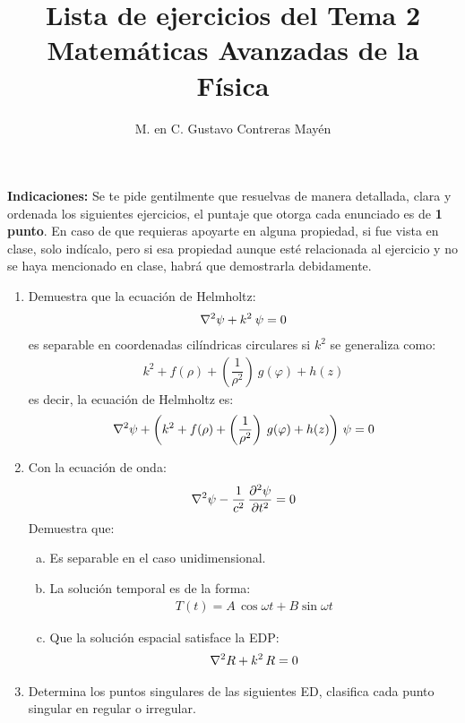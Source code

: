 \documentclass[hidelinks,12pt]{article}
\title{Lista de ejercicios del Tema 2 \\[0.3em]  \large{Matemáticas Avanzadas de la Física}\vspace{-3ex}}
\author{M. en C. Gustavo Contreras Mayén}
\date{ }
\begin{document}
\vspace{-4cm}
\maketitle

\fontsize{14}{14}\selectfont

\textbf{Indicaciones: } Se te pide gentilmente que resuelvas de manera detallada, clara y ordenada los siguientes ejercicios, el puntaje que otorga cada enunciado es de \textbf{1 punto}. En caso de que requieras apoyarte en alguna propiedad, si fue vista en clase, solo indícalo, pero si esa propiedad aunque esté relacionada al ejercicio y no se haya mencionado en clase, habrá que demostrarla debidamente.

\begin{enumerate}
\item Demuestra que la ecuación de Helmholtz:
\begin{align*}
\laplacian \psi + k^{2} \: \psi = 0
\end{align*}
es separable en coordenadas cilíndricas circulares si $k^{2}$ se generaliza como:
\begin{align*}
k^{2} + f(\rho) + \left( \dfrac{1}{\rho^{2}} \right) \: g(\varphi) + h(z)
\end{align*}
es decir, la ecuación de Helmholtz es:
\begin{align*}
\laplacian \psi + \left( k^{2} + f(\rho) + \left( \dfrac{1}{\rho^{2}} \right) \: g(\varphi) + h(z) \right) \, \psi = 0
\end{align*}
\item Con la ecuación de onda:
\begin{align*}
\laplacian{\psi} - \dfrac{1}{c^{2}} \, \pdv[2]{\psi}{t} = 0
\end{align*}
Demuestra que:
\begin{enumerate}[a)]
\item Es separable en el caso unidimensional.
\item La solución temporal es de la forma:
\begin{align*}
T (t) = A \, \cos \omega t + B \sin \omega t
\end{align*}
\item Que la solución espacial satisface la EDP:
\begin{align*}
\laplacian{R} + k^{2} \, R = 0
\end{align*}
\end{enumerate}
\item Determina los puntos singulares de las siguientes ED, clasifica cada punto singular en regular o irregular.

\end{enumerate}
\end{document}
